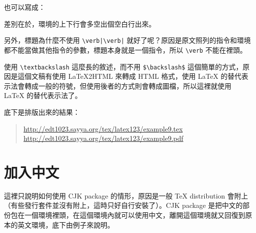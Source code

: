 也可以寫成：


差別在於，環境的上下行會多空出個空白行出來。

另外，標題為什麼不使用 \verb+\verb|\verb|+ 就好了呢？原因是原文照列的指令和環境都不能當做其他指令的參數，標題本身就是一個指令，所以 \verb+\verb+ 不能在裡頭。

使用 \verb|\textbackslash| 這麼長的敘述，而不用 \verb|$\backslash$| 這個簡單的方式，原因是這個文稿有使用 \LaTeX{}2{\ttfamily HTML} 來轉成 HTML 格式，使用 \LaTeX{} 的替代表示法會轉成一般的符號，但使用後者的方式則會轉成圖檔，所以這裡就使用 \LaTeX{} 的替代表示法了。

底下是排版出來的結果：

\begin{quote}
   \url{http://edt1023.sayya.org/tex/latex123/example9.tex} \\
   \url{http://edt1023.sayya.org/tex/latex123/example9.pdf}
\end{quote}

\section{加入中文}

這裡只說明如何使用 \textsf{CJK} package 的情形，原因是一般 \TeX{} distribution 會附上（有些發行套件並沒有附上，這時只好自行安裝了）。\textsf{CJK} package 是把中文的部份包在一個環境裡頭，在這個環境內就可以使用中文，離開這個環境就又回復到原本的英文環境，底下由例子來說明。

